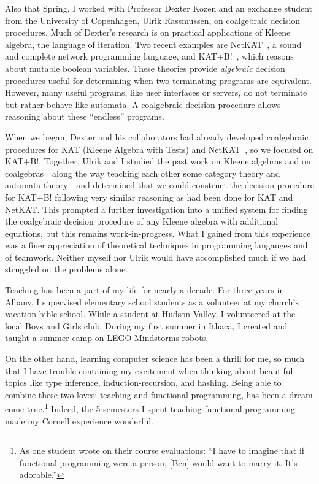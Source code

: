\documentclass[12pt]{article}
\newcommand{\hdr}[2]{\vspace{-0.4cm}{\flushleft{\hrulefill\\\textbf{#1}\hfill{#2}\\\vspace{-0.2cm}\hrulefill}}\vspace{0.1cm}}
\begin{document}
\hdr{Kleene Coalgebras}{Spring 2014}

Also that Spring, I worked with Professor Dexter Kozen and an exchange student from the University of Copenhagen, Ulrik Rassmussen, on coalgebraic decision procedures.
Much of Dexter's research is on practical applications of Kleene algebra, the language of iteration.
Two recent examples are NetKAT~\cite{anderson2014netkat}, a sound and complete network programming language, and KAT+B!~\cite{GKM14a}, which reasons about mutable boolean variables.
These theories provide \emph{algebraic} decision procedures useful for determining when two terminating programs are equivalent.
However, many useful programs, like user interfaces or servers, do not terminate but rather behave like automata.
A coalgebraic decision procedure allows reasoning about these ``endless'' programs.

When we began, Dexter and his collaborators had already developed coalgebraic procedures for KAT (Kleene Algebra with Tests) and NetKAT~\cite{foster2014coalgebraic}, so we focused on KAT+B!.
Together, Ulrik and I studied the past work on Kleene algebras and on coalgebras~\textemdash~along the way teaching each other some category theory and automata theory~\textemdash~and determined that we could construct the decision procedure for KAT+B! following very similar reasoning as had been done for KAT and NetKAT.
This prompted a further investigation into a unified system for finding the coalgebraic decision procedure of any Kleene algebra with additional equations, but this remains work-in-progress.
What I gained from this experience was a finer appreciation of theoretical techniques in programming langauges and of teamwork.
Neither myself nor Ulrik would have accomplished much if we had struggled on the problems alone.

\hdr{Broader Impacts}{}

Teaching has been a part of my life for nearly a decade.
For three years in Albany, I supervised elementary school students as a volunteer at my church's vacation bible school.
While a student at Hudson Valley, I volunteered at the local Boys and Girls club.
During my first summer in Ithaca, I created and taught a summer camp on LEGO Mindstorms robots.

On the other hand, learning computer science has been a thrill for me, so much that I have trouble containing my excitement when thinking about beautiful topics like type inference, induction-recursion, and hashing.
Being able to combine these two loves: teaching and functional programming, has been a dream come true.\footnote{As one student wrote on their course evaluations: ``I have to imagine that if functional programming were a person, [Ben] would want to marry it. It's adorable.''}
Indeed, the 5 semesters I spent teaching functional programming made my Cornell experience wonderful.
\end{document}
